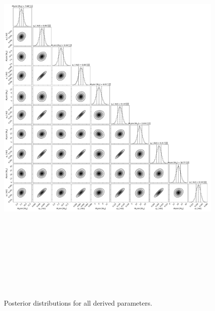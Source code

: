 \documentclass{emulateapj}
\begin{document}
\begin{figure}[!h]
\centering

\includegraphics[height=8.0in,width=6.0in,keepaspectratio]{rdvel+harps_corner_derived_pars.pdf}
\caption{Posterior distributions for all derived parameters.}
\end{figure} 

\end{document}
